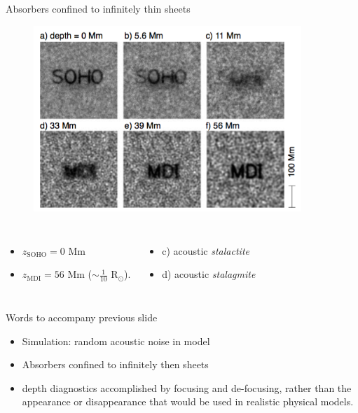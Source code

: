 \documentclass{beamer}
\begin{document}
\begin{frame}{Absorbers confined to infinitely thin sheets}
    \begin{figure}
        \includegraphics[width=0.9\textwidth]{fig_3.png}
    \end{figure}
    \vspace{-0.5cm}
    \begin{columns}
        \column{0.5\paperwidth}
            \begin{itemize}
                \item $z_{\textrm{SOHO}} = 0$ Mm
                \item $z_{\textrm{MDI}} = 56$ Mm
                    ($\sim \frac{1}{10}$ R$_{\odot}$).
            \end{itemize}
        \column{0.5\paperwidth}
            \begin{itemize}
                \item c) acoustic \emph{stalactite}
                \item d) acoustic \emph{stalagmite}
            \end{itemize}
    \end{columns}
\end{frame}

\begin{frame}{Words to accompany previous slide}
    \begin{itemize}
        \item Simulation: random acoustic noise in model
        \item Absorbers confined to infinitely then sheets
        \item depth diagnostics accomplished by focusing and
            de-focusing, rather than the appearance or disappearance that
            would be used in realistic physical models.
    \end{itemize}
\end{frame}
\end{document}
